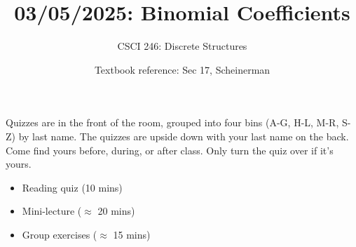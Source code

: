 \documentclass[10pt]{beamer}
\begin{document}






\title{03/05/2025: Binomial Coefficients}
\author{CSCI 246: Discrete Structures}
\date{Textbook reference: Sec 17, Scheinerman}

\begin{frame}
    \titlepage 
\end{frame}


\begin{frame}
\footnotesize 
\begin{mygreenbox}[title=Graded Quiz Pickup]
Quizzes are in the front of the room, grouped into four bins (A-G, H-L, M-R, S-Z) by last name. The quizzes are upside down with your last name on the back. Come find yours before, during, or after class.  Only turn the quiz over if it's yours.
\end{mygreenbox} 
\vfill 


\vfill 


\begin{myyellowbox}[title=Today's Agenda]
\begin{itemize}
	\item Reading quiz (10 mins)
	\item Mini-lecture ($\approx$ 20 mins)
	\item Group exercises ($\approx$ 15 mins)
\end{itemize}

%	
\end{myyellowbox}
\vfill 

\end{frame}
\end{document}
